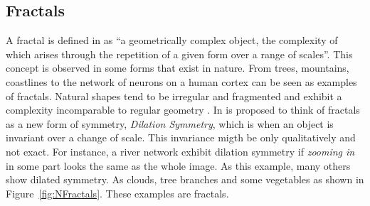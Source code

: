 
\subsection{Fractals} %
\label{ssub:fractals}


A fractal is defined in \cite{Ebert2002} as ``a geometrically complex object, the complexity of which arises through the repetition of a given form over a range of scales''.
This concept is observed in some forms that exist in nature. From trees, mountains, coastlines to the network of neurons on a human cortex can be seen as examples of fractals. Natural shapes tend to be irregular and fragmented and exhibit a complexity incomparable to regular geometry \cite{mandelbrot1984fractal}.
In \cite{Ebert2002} is proposed to think of fractals as a new form of symmetry, \emph{Dilation Symmetry}, which is when an object is invariant over a change of scale. This invariance migth be only qualitatively and not exact. For instance, a river network exhibit dilation symmetry if \textit{zooming in} in some part looks the same as the whole image. As this example, many others show dilated symmetry. As clouds, tree branches and some vegetables as shown in Figure~\ref{fig:NFractals}. These examples are fractals.

